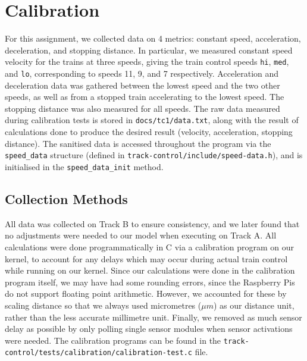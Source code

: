 \documentclass[12pt, titlepage]{article}
\begin{document}

    \section{Calibration}
    \label{sec:calibration}
    For this assignment, we collected data on 4 metrics: constant speed, acceleration, deceleration, and stopping distance. In particular, we measured constant speed velocity for the trains at three speeds, giving the train control speeds \verb`hi`, \verb`med`, and \verb`lo`, corresponding to speeds 11, 9, and 7 respectively. Acceleration and deceleration data was gathered between the lowest speed and the two other speeds, as well as from a stopped train accelerating to the lowest speed. The stopping distance was also measured for all speeds. The raw data measured during calibration tests is stored in \verb`docs/tc1/data.txt`, along with the result of calculations done to produce the desired result (velocity, acceleration, stopping distance). The sanitised data is accessed throughout the program via the \verb`speed_data` structure (defined in \verb`track-control/include/speed-data.h`), and is initialised in the \verb`speed_data_init` method.

    \subsection{Collection Methods}

    All data was collected on Track B to ensure consistency, and we later found that no adjustments were needed to our model when executing on Track A. All calculations were done programmatically in C via a calibration program on our kernel, to account for any delays which may occur during actual train control while running on our kernel. Since our calculations were done in the calibration program itself, we may have had some rounding errors, since the Raspberry Pis do not support floating point arithmetic. However, we accounted for these by scaling distance so that we always used micrometres ($\mu m$) as our distance unit, rather than the less accurate millimetre unit. Finally, we removed as much sensor delay as possible by only polling single sensor modules when sensor activations were needed. The calibration programs can be found in the \verb`track-control/tests/calibration/calibration-test.c` file.
    
\end{document}
